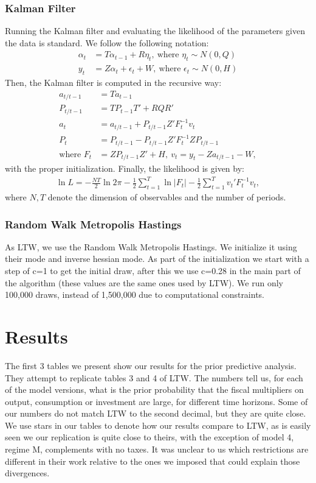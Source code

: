 \documentclass[letterpaper,12pt]{article}%
\begin{document}
\subsubsection*{Kalman Filter}
Running the Kalman filter and evaluating the likelihood of the parameters given the data is standard. We follow the following notation:
\begin{align*}
\alpha_t &= T \alpha_{t-1} + R \eta_t, \ \text{where } \eta_t \sim N(0,Q) \\
y_t &= Z \alpha_t + \epsilon_t + W, \ \text{where } \epsilon_t \sim N(0,H)
\end{align*}
Then, the Kalman filter is computed in the recursive way:
\begin{align*}
a_{t/t-1} &= T a_{t-1} \\
P_{t/t-1} &= T P_{t-1} T' + R Q R' \\
a_t &= a_{t/t-1} + P_{t/t-1} Z' F_t^{-1} v_t\\
P_t &= P_{t/t-1} - P_{t/t-1} Z' F_t^{-1} Z P_{t/t-1} \\
\text{where } F_t&= Z P_{t/t-1} Z' + H, \ v_t = y_t - Z a_{t/t-1} - W,
\end{align*}
with the proper initialization. Finally, the likelihood is given by:
\begin{align*}
\ln L = -\frac{NT}{2} \ln 2\pi - \frac{1}{2} \sum_{t=1}^{T} \ln |F_t| - \frac{1}{2} \sum_{t=1}^T v_t' F_t^{-1} v_t,
\end{align*}
where $N,T$ denote the dimension of observables and the number of periods.

\subsubsection*{Random Walk Metropolis Hastings}
As LTW, we use the Random Walk Metropolis Hastings. We initialize it using their mode and inverse hessian mode. As part of the initialization we start with a step of c=1 to get the initial draw, after this we use c=0.28 in the main part of the algorithm (these values are the same ones used by LTW). We run only 100,000 draws, instead of 1,500,000 due to computational constraints.

\section{Results}
The first 3 tables we present show our results for the prior predictive analysis. They attempt to replicate tables 3 and 4 of LTW. The numbers tell us, for each of the model versions, what is the prior probability that the fiscal multipliers on output, consumption or investment are large, for different time horizons. Some of our numbers do not match LTW to the second decimal, but they are quite close. We use stars in our tables to denote how our results compare to LTW, as is easily seen we our replication is quite close to theirs, with the exception of model 4, regime M, complements with no taxes. It was unclear to us which restrictions are different in their work relative to the ones we imposed that could explain those divergences.
\end{document}
